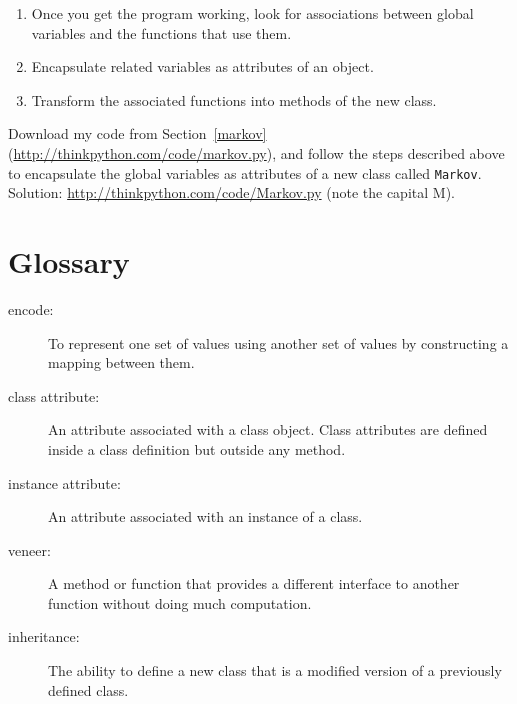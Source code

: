 \documentclass[10pt]{book}
\begin{document}
\begin{CJK}{UTF8}{gbsn}
\begin{enumerate}
\item Once you get the program working, look for associations
between global variables and the functions that use them.

\item Encapsulate related variables as attributes of an object.

\item Transform the associated functions into methods of the new
class.

\end{enumerate}


\begin{exercise}

Download my code from Section~\ref{markov}
(\url{http://thinkpython.com/code/markov.py}), and follow the steps described
above to encapsulate the global variables as attributes of a new class
called {\tt Markov}.  Solution: \url{http://thinkpython.com/code/Markov.py}
(note the capital M).

\end{exercise}




\section{Glossary}

\begin{description}

\item[encode:]  To represent one set of values using another
set of values by constructing a mapping between them.

\item[class attribute:] An attribute associated with a class
object.  Class attributes are defined inside
a class definition but outside any method.

\item[instance attribute:] An attribute associated with an
instance of a class.

\item[veneer:] A method or function that provides a different
interface to another function without doing much computation.

\item[inheritance:] The ability to define a new class that is a
modified version of a previously defined class.


\end{description}
\end{CJK}
\end{document}
